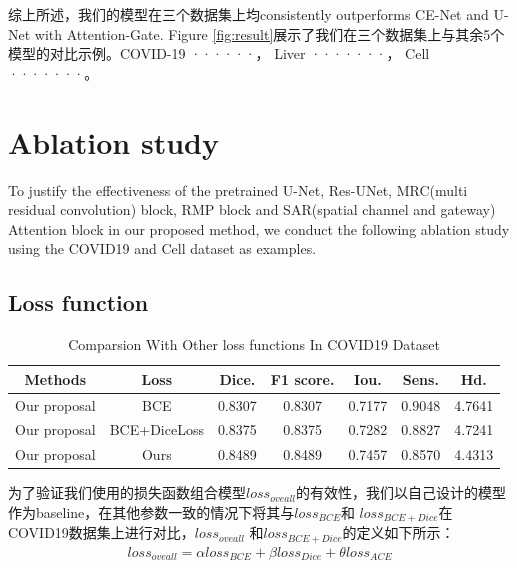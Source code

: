 \documentclass{ieeeaccess}
\begin{document}
  
   综上所述，我们的模型在三个数据集上均consistently outperforms CE-Net and U-Net with Attention-Gate. 
   Figure \ref{fig:result}展示了我们在三个数据集上与其余5个模型的对比示例。COVID-19 ······， Liver ·······， Cell ·······。
  
    \section{Ablation study}
    To justify the effectiveness of the pretrained U-Net\cite{unet}, Res-UNet\cite{ResUNet}, 
    MRC(multi residual convolution) block, RMP block and SAR(spatial channel and gateway) Attention block
    in our proposed method, we conduct the following ablation study using the COVID19 and Cell dataset as examples.
  
    \subsection{Loss function}
    \begin{table}[htbp]
      \vspace{-2mm}
      \begin{center}\small
          \label{loss-table}
          \begin{tabular}{ccccccc}
              \toprule
              Methods & Loss & Dice. & F1 score. & Iou. & Sens. & Hd.\\
              \midrule
              Our proposal & BCE          & 0.8307 & 0.8307 & 0.7177 & 0.9048 & 4.7641\\
              Our proposal & BCE+DiceLoss & 0.8375 & 0.8375 & 0.7282 & 0.8827 & 4.7241\\
              Our proposal & Ours         & 0.8489 & 0.8489 & 0.7457 & 0.8570 & 4.4313\\
          \bottomrule    
          \end{tabular}
  
  
          \caption{Comparsion With Other loss functions In COVID19\cite{covid19} Dataset}
      \end{center}
      \vspace{-4mm}
    \end{table}
    为了验证我们使用的损失函数组合模型\(loss_{oveall}\)的有效性，我们以自己设计的模型作为baseline，在其他参数一致的情况下将其与\(loss_{BCE}\)和
    \(loss_{BCE+Dice}\)在COVID19数据集上进行对比，\(loss_{oveall}\)
    和\(loss_{BCE+Dice}\)的定义如下所示：
    \begin{align}
      loss_{oveall} = \alpha loss_{BCE} + \beta loss_{Dice} + \theta loss_{ACE}
    \end{align}
\end{document}
